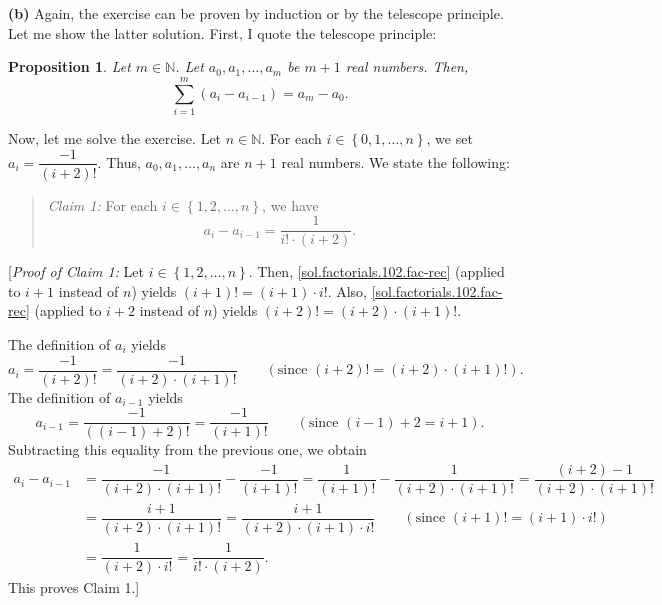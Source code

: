 \documentclass[paper=a4, fontsize=12pt]{scrartcl}%
\let\sumnonlimits\sum
\renewcommand{\sum}{\sumnonlimits\limits}
\theoremstyle{plainsl}
\newtheorem{proposition}[theorem]{Proposition}
\theoremstyle{definition}
\theoremstyle{remark}
\newenvironment{statement}{\begin{quote}}{\end{quote}}
\begin{document}
\vspace{0.806pc}

\textbf{(b)} Again, the exercise can be proven by induction or by the
telescope principle. Let me show the latter solution. First, I quote the
telescope principle:

\begin{proposition}
\label{prop.sums.telescope}Let $m\in\mathbb{N}$. Let $a_{0},a_{1},\ldots
,a_{m}$ be $m+1$ real numbers. Then,
\[
\sum_{i=1}^{m}\left(  a_{i}-a_{i-1}\right)  =a_{m}-a_{0}.
\]

\end{proposition}

Now, let me solve the exercise. Let $n\in\mathbb{N}$. For each $i\in\left\{
0,1,\ldots,n\right\}  $, we set $a_{i}=\dfrac{-1}{\left(  i+2\right)  !}$.
Thus, $a_{0},a_{1},\ldots,a_{n}$ are $n+1$ real numbers. We state the following:

\begin{statement}
\textit{Claim 1:} For each $i\in\left\{  1,2,\ldots,n\right\}  $, we have%
\[
a_{i}-a_{i-1}=\dfrac{1}{i!\cdot\left(  i+2\right)  }.
\]

\end{statement}

[\textit{Proof of Claim 1:} Let $i\in\left\{  1,2,\ldots,n\right\}  $. Then,
\eqref{sol.factorials.102.fac-rec} (applied to $i+1$ instead of $n$) yields
$\left(  i+1\right)  !=\left(  i+1\right)  \cdot i!$. Also,
\eqref{sol.factorials.102.fac-rec} (applied to $i+2$ instead of $n$) yields
$\left(  i+2\right)  !=\left(  i+2\right)  \cdot\left(  i+1\right)  !$.

The definition of $a_{i}$ yields%
\[
a_{i}=\dfrac{-1}{\left(  i+2\right)  !}=\dfrac{-1}{\left(  i+2\right)
\cdot\left(  i+1\right)  !}\qquad\left(  \text{since }\left(  i+2\right)
!=\left(  i+2\right)  \cdot\left(  i+1\right)  !\right)  .
\]
The definition of $a_{i-1}$ yields%
\[
a_{i-1}=\dfrac{-1}{\left(  \left(  i-1\right)  +2\right)  !}=\dfrac
{-1}{\left(  i+1\right)  !}\qquad\left(  \text{since }\left(  i-1\right)
+2=i+1\right)  .
\]
Subtracting this equality from the previous one, we obtain
\begin{align*}
a_{i}-a_{i-1}  &  =\dfrac{-1}{\left(  i+2\right)  \cdot\left(  i+1\right)
!}-\dfrac{-1}{\left(  i+1\right)  !}=\dfrac{1}{\left(  i+1\right)  !}%
-\dfrac{1}{\left(  i+2\right)  \cdot\left(  i+1\right)  !}=\dfrac{\left(
i+2\right)  -1}{\left(  i+2\right)  \cdot\left(  i+1\right)  !}\\
&  =\dfrac{i+1}{\left(  i+2\right)  \cdot\left(  i+1\right)  !}=\dfrac
{i+1}{\left(  i+2\right)  \cdot\left(  i+1\right)  \cdot i!}\qquad\left(
\text{since }\left(  i+1\right)  !=\left(  i+1\right)  \cdot i!\right) \\
&  =\dfrac{1}{\left(  i+2\right)  \cdot i!}=\dfrac{1}{i!\cdot\left(
i+2\right)  }.
\end{align*}
This proves Claim 1.]
\end{document}
